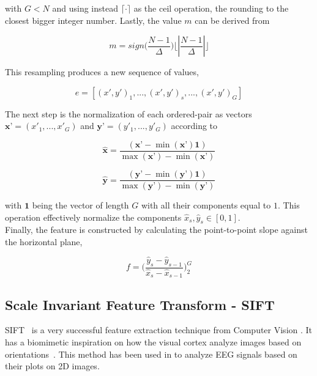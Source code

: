 \documentclass[brainsci,article,submit,moreauthors,pdftex,10pt,a4paper]{mdpi}
\begin{document}
\noindent with $ G < N $ and using instead $\lceil \cdot \rceil$ as the ceil operation, the rounding to the closest bigger integer number. Lastly, the value $m$ can be derived from

\begin{equation}
m = sign \bigg (  \frac{N-1}{\Delta} \bigg )  \bigg \lfloor \left\lvert \frac{N-1}{\Delta} \right\lvert \bigg \rfloor
\label{eq:shcc4}
\end{equation}

This resampling produces a new sequence of values,

\begin{equation}
e = \left[ (x',y')_{1}, ...,(x',y')_{s}, ..., (x',y')_{G} \right]
\label{eq:shcc5}
\end{equation}

The next step is the normalization of each ordered-pair as vectors $\textbf{x'} = (x'_{1},...,x'_{G})$ and $\textbf{y'} = (y'_{1},...,y'_{G})$ according to

\begin{equation}
\hat{\textbf{x}} = \frac{( \textbf{x'} - \min(\textbf{x'}) \textbf{1} )}{\max(\textbf{x'}) - \min(\textbf{x'})} 
\label{eq:shcc6}
\end{equation}

\begin{equation}
\hat{\textbf{y}} = \frac{( \textbf{y'} - \min(\textbf{y'}) \textbf{1} )}{\max(\textbf{y'}) - \min(\textbf{y'})} 
\label{eq:shcc7}
\end{equation}

\noindent with $\textbf{1}$ being the vector of length $G$ with all their components equal to $1$.  This operation effectively normalize the components $\hat{x}_{s},\hat{y}_{s} \in [0,1]$.\\

Finally, the feature is constructed by calculating the point-to-point slope against the horizontal plane,

\begin{equation}
f = \bigg (  \frac{\hat{y}_{s}-\hat{y}_{s-1}}{\hat{x}_{s}-\hat{x}_{s-1}}  \bigg )_{2}^{G} 
\label{eq:shcc8}
\end{equation}


\subsection{Scale Invariant Feature Transform - SIFT}

SIFT~\citep{Lowe2004} is a very successful feature extraction technique from Computer Vision .  It has a biomimetic inspiration on how the visual cortex analyze images based on orientations~\citep{cogprints561}.  This method has been used in \citep{Ramele2016} to analyze EEG signals based on their plots on 2D images.
\end{document}

